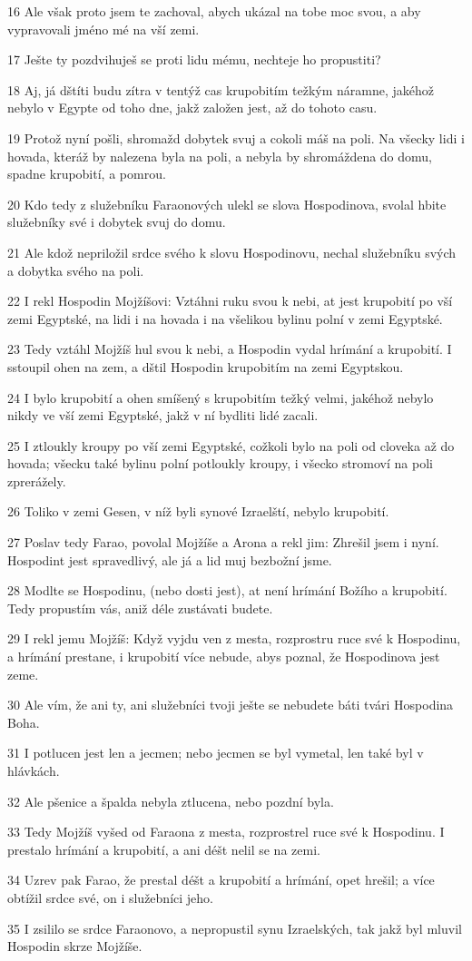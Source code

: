 \par 16 Ale však proto jsem te zachoval, abych ukázal na tobe moc svou, a aby vypravovali jméno mé na vší zemi.
\par 17 Ješte ty pozdvihuješ se proti lidu mému, nechteje ho propustiti?
\par 18 Aj, já dštíti budu zítra v tentýž cas krupobitím težkým náramne, jakéhož nebylo v Egypte od toho dne, jakž založen jest, až do tohoto casu.
\par 19 Protož nyní pošli, shromažd dobytek svuj a cokoli máš na poli. Na všecky lidi i hovada, kteráž by nalezena byla na poli, a nebyla by shromáždena do domu, spadne krupobití, a pomrou.
\par 20 Kdo tedy z služebníku Faraonových ulekl se slova Hospodinova, svolal hbite služebníky své i dobytek svuj do domu.
\par 21 Ale kdož nepriložil srdce svého k slovu Hospodinovu, nechal služebníku svých a dobytka svého na poli.
\par 22 I rekl Hospodin Mojžíšovi: Vztáhni ruku svou k nebi, at jest krupobití po vší zemi Egyptské, na lidi i na hovada i na všelikou bylinu polní v zemi Egyptské.
\par 23 Tedy vztáhl Mojžíš hul svou k nebi, a Hospodin vydal hrímání a krupobití. I sstoupil ohen na zem, a dštil Hospodin krupobitím na zemi Egyptskou.
\par 24 I bylo krupobití a ohen smíšený s krupobitím težký velmi, jakéhož nebylo nikdy ve vší zemi Egyptské, jakž v ní bydliti lidé zacali.
\par 25 I ztloukly kroupy po vší zemi Egyptské, cožkoli bylo na poli od cloveka až do hovada; všecku také bylinu polní potloukly kroupy, i všecko stromoví na poli zprerážely.
\par 26 Toliko v zemi Gesen, v níž byli synové Izraelští, nebylo krupobití.
\par 27 Poslav tedy Farao, povolal Mojžíše a Arona a rekl jim: Zhrešil jsem i nyní. Hospodint jest spravedlivý, ale já a lid muj bezbožní jsme.
\par 28 Modlte se Hospodinu, (nebo dosti jest), at není hrímání Božího a krupobití. Tedy propustím vás, aniž déle zustávati budete.
\par 29 I rekl jemu Mojžíš: Když vyjdu ven z mesta, rozprostru ruce své k Hospodinu, a hrímání prestane, i krupobití více nebude, abys poznal, že Hospodinova jest zeme.
\par 30 Ale vím, že ani ty, ani služebníci tvoji ješte se nebudete báti tvári Hospodina Boha.
\par 31 I potlucen jest len a jecmen; nebo jecmen se byl vymetal, len také byl v hlávkách.
\par 32 Ale pšenice a špalda nebyla ztlucena, nebo pozdní byla.
\par 33 Tedy Mojžíš vyšed od Faraona z mesta, rozprostrel ruce své k Hospodinu. I prestalo hrímání a krupobití, a ani déšt nelil se na zemi.
\par 34 Uzrev pak Farao, že prestal déšt a krupobití a hrímání, opet hrešil; a více obtížil srdce své, on i služebníci jeho.
\par 35 I zsililo se srdce Faraonovo, a nepropustil synu Izraelských, tak jakž byl mluvil Hospodin skrze Mojžíše.

